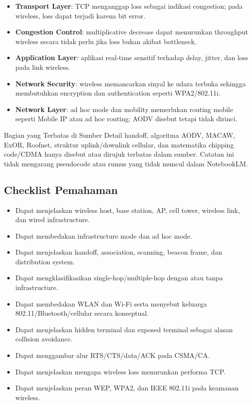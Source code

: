 \begin{itemize}
    \item \textbf{Transport Layer}: TCP menganggap loss sebagai indikasi congestion; pada wireless, loss dapat terjadi karena bit error.
    \item \textbf{Congestion Control}: multiplicative decrease dapat menurunkan throughput wireless secara tidak perlu jika loss bukan akibat bottleneck.
    \item \textbf{Application Layer}: aplikasi real-time sensitif terhadap delay, jitter, dan loss pada link wireless.
    \item \textbf{Network Security}: wireless memancarkan sinyal ke udara terbuka sehingga membutuhkan encryption dan authentication seperti WPA2/802.11i.
    \item \textbf{Network Layer}: ad hoc mode dan mobility memerlukan routing mobile seperti Mobile IP atau ad hoc routing; AODV disebut tetapi tidak dirinci.
\end{itemize}

\begin{cmt}{Bagian yang Terbatas di Sumber}{}
Detail handoff, algoritma AODV, MACAW, ExOR, Roofnet, struktur uplink/downlink cellular, dan matematika chipping code/CDMA hanya disebut atau dirujuk terbatas dalam sumber. Catatan ini tidak mengarang pseudocode atau rumus yang tidak muncul dalam NotebookLM.
\end{cmt}

\subsection{Checklist Pemahaman}

\begin{itemize}
    \item Dapat menjelaskan wireless host, base station, AP, cell tower, wireless link, dan wired infrastructure.
    \item Dapat membedakan infrastructure mode dan ad hoc mode.
    \item Dapat menjelaskan handoff, association, scanning, beacon frame, dan distribution system.
    \item Dapat mengklasifikasikan single-hop/multiple-hop dengan atau tanpa infrastructure.
    \item Dapat membedakan WLAN dan Wi-Fi serta menyebut keluarga 802.11/Bluetooth/cellular secara konseptual.
    \item Dapat menjelaskan hidden terminal dan exposed terminal sebagai alasan collision avoidance.
    \item Dapat menggambar alur RTS/CTS/data/ACK pada CSMA/CA.
    \item Dapat menjelaskan mengapa wireless loss menurunkan performa TCP.
    \item Dapat menjelaskan peran WEP, WPA2, dan IEEE 802.11i pada keamanan wireless.
\end{itemize}
